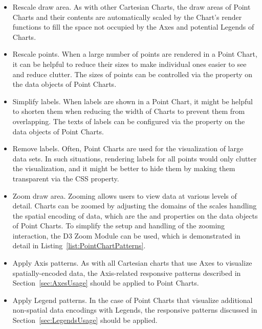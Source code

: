 \begin{itemize}

\item
Rescale draw area.
As with other Cartesian Charts, the draw areas of Point Charts and their contents are automatically scaled by the Chart's render functions to fill the space not occupied by the Axes and potential Legends of Charts.

\item
Rescale points.
When a large number of points are rendered in a Point Chart, it can be helpful to reduce their sizes to make individual ones easier to see and reduce clutter.
The sizes of points can be controlled via the  property on the data objects of Point Charts.

\item
Simplify labels.
When labels are shown in a Point Chart, it might be helpful to shorten them when reducing the width of Charts to prevent them from overlapping.
The texts of labels can be configured via the  property on the data objects of Point Charts.

\item
Remove labels.
Often, Point Charts are used for the visualization of large data sets.
In such situations, rendering labels for all points would only clutter the visualization, and it might be better to hide them by making them transparent via the CSS  property. 

\item
Zoom draw area.
Zooming allows users to view data at various levels of detail.
Charts can be zoomed by adjusting the domains of the scales handling the spatial encoding of data, which are the  and  properties on the data objects of Point Charts.
To simplify the setup and handling of the zooming interaction, the D3 Zoom Module \parencite{D3Zoom} can be used, which is demonstrated in detail in Listing~\ref{list:PointChartPatterns}.

\item
Apply Axis patterns.
As with all Cartesian charts that use Axes to visualize spatially-encoded data, the Axis-related responsive patterns described in Section~\ref{sec:AxesUsage} should be applied to Point Charts.

\item
Apply Legend patterns.
In the case of Point Charts that visualize additional non-spatial data encodings with Legends, the responsive patterns discussed in Section~\ref{sec:LegendsUsage} should be applied.  

\end{itemize} 


